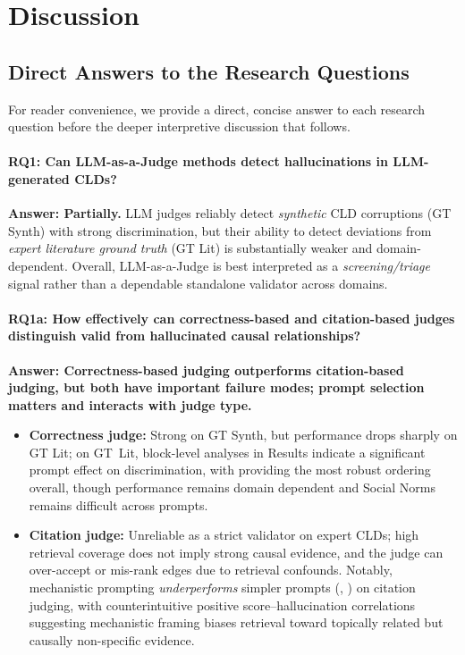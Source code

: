 \chapter{Discussion}
\label{sec:discussion}



\section{Direct Answers to the Research Questions}
\label{sec:discussion_rq_answers}
For reader convenience, we provide a direct, concise answer to each research question before the deeper interpretive discussion that follows.

\subsubsection*{RQ1: Can LLM-as-a-Judge methods detect hallucinations in LLM-generated CLDs?}
\textbf{Answer: Partially.} LLM judges reliably detect \textit{synthetic} CLD corruptions (GT Synth) with strong discrimination, but their ability to detect deviations from \textit{expert literature ground truth} (GT Lit) is substantially weaker and domain-dependent. Overall, LLM-as-a-Judge is best interpreted as a \textit{screening/triage} signal rather than a dependable standalone validator across domains.

\subsubsection*{RQ1a: How effectively can correctness-based and citation-based judges distinguish valid from hallucinated causal relationships?}
\textbf{Answer: Correctness-based judging outperforms citation-based judging, but both have important failure modes; prompt selection matters and interacts with judge type.}
\begin{itemize}[noitemsep]
    \item \textbf{Correctness judge:} Strong on GT Synth, but performance drops sharply on GT Lit; on GT~Lit, block-level analyses in Results indicate a significant prompt effect on discrimination, with \PromptMechanistic{} providing the most robust ordering overall, though performance remains domain dependent and Social Norms remains difficult across prompts.
    \item \textbf{Citation judge:} Unreliable as a strict validator on expert CLDs; high retrieval coverage does not imply strong causal evidence, and the judge can over-accept or mis-rank edges due to retrieval confounds. Notably, mechanistic prompting \emph{underperforms} simpler prompts (\PromptBaseline{}, \PromptCoT{}) on citation judging, with counterintuitive positive score--hallucination correlations suggesting mechanistic framing biases retrieval toward topically related but causally non-specific evidence.
\end{itemize}

